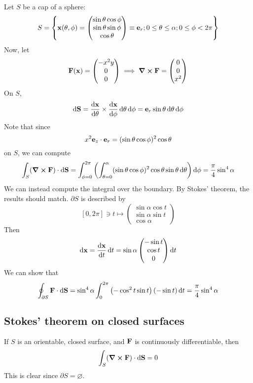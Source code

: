 \begin{example}
	Let \(S\) be a cap of a sphere:
	\[
		S = \left\{ \vb x(\theta, \phi) = \begin{pmatrix}
			\sin\theta\cos\phi \\ \sin\theta\sin\phi \\ \cos\theta
		\end{pmatrix} \equiv \vb e_r; 0 \leq \theta \leq \alpha; 0 \leq \phi < 2 \pi \right\}
	\]
	Now, let
	\[
		\vb F(\vb x) = \begin{pmatrix}
			-x^2y \\ 0 \\ 0
		\end{pmatrix} \implies \curl{\vb F} = \begin{pmatrix}
			0 \\ 0 \\ x^2
		\end{pmatrix}
	\]
	On \(S\),
	\[
		\dd {\vb S} = \dv{\vb x}{\theta} \times \dv{\vb x}{\phi} \dd{\theta}\dd{\phi} = \vb e_r \sin\theta \dd{\theta}\dd{\phi}
	\]
	Note that since
	\[
		x^2 \vb e_z \cdot \vb e_r = (\sin\theta\cos\phi)^2 \cos\theta
	\]
	on \(S\), we can compute
	\[
		\int_S (\curl{\vb F}) \cdot \dd{\vb S} = \int_{\phi = 0}^{2 \pi} \left( \int_{\theta = 0}^\alpha (\sin\theta\cos\phi)^2 \cos\theta \sin\theta \dd{\theta} \right) \dd{\phi} = \frac{\pi}{4}\sin^4 \alpha
	\]
	We can instead compute the integral over the boundary.
	By Stokes' theorem, the results should match.
	\(\partial S\) is described by
	\[
		[0, 2\pi] \ni t \mapsto \begin{pmatrix}
			\sin\alpha\cos t \\ \sin\alpha\sin t \\ \cos\alpha
		\end{pmatrix}
	\]
	Then
	\[
		\dd{\vb x} = \dv{\vb x}{t} \dd{t} = \sin \alpha\begin{pmatrix}
			-\sin t \\ \cos t \\ 0
		\end{pmatrix} \dd{t}
	\]
	We can show that
	\[
		\oint_{\partial S} \vb F \cdot \dd{\vb S} = \sin^4 \alpha \int_0^{2\pi} \left( -\cos^2 t \sin t \right)\left( -\sin t \right) \dd{t} = \frac{\pi}{4}\sin^4 \alpha
	\]
\end{example}

\subsection{Stokes' theorem on closed surfaces}
If \(S\) is an orientable, closed surface, and \(\vb F\) is continuously differentiable, then
\[
	\int_S (\curl{\vb F}) \cdot \dd{\vb S} = 0
\]
This is clear since \(\partial S = \varnothing\).

